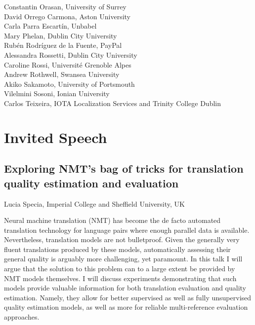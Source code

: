 \documentclass[a4paper,11pt,twoside]{book}
\newcommand{\newoddpage} {\clearpage
  \ifthenelse{\isodd{\value{page}}}{}
  {\thispagestyle{empty}\quad\newpage}}
\begin{document}
\noindent Constantin Orasan, University of Surrey\\
\noindent David Orrego Carmona, Aston University\\
\noindent Carla Parra Escartín, Unbabel\\
\noindent Mary Phelan, Dublin City University\\
\noindent Rubén Rodríguez de la Fuente, PayPal\\
\noindent Alessandra Rossetti, Dublin City University\\
\noindent Caroline Rossi, Université Grenoble Alpes\\
\noindent Andrew Rothwell, Swansea University\\
\noindent Akiko Sakamoto, University of Portsmouth\\
\noindent Vilelmini Sosoni, Ionian University\\
\noindent Carlos Teixeira, IOTA Localization Services and Trinity College Dublin


\newoddpage
\mainmatter

\chapter*{Invited Speech}

\section*{Exploring NMT's bag of tricks for translation quality estimation and evaluation}\label{invited}
Lucia Specia, Imperial College and Sheffield University, UK
\vspace{0.5cm}

Neural machine translation (NMT) has become the de facto automated translation technology for language pairs where enough parallel data is available. Nevertheless, translation models are not bulletproof. Given the generally very fluent translations produced by these models, automatically assessing their general quality is arguably more challenging, yet paramount. In this talk I will argue that the solution to this problem can to a large extent be provided by NMT models themselves. I will discuss experiments demonstrating that such models provide valuable information for both translation evaluation and quality estimation. Namely, they allow for better supervised as well as fully unsupervised quality estimation models, as well as more for reliable multi-reference evaluation approaches.
\end{document}
